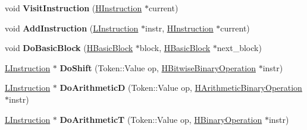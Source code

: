 \begin{DoxyCompactItemize}
\item 
void {\bfseries Visit\+Instruction} (\hyperlink{classv8_1_1internal_1_1_h_instruction}{H\+Instruction} $\ast$current)\hypertarget{classv8_1_1internal_1_1_l_chunk_builder_a4da411e2e5777292cd23626bb87e5dc4}{}\label{classv8_1_1internal_1_1_l_chunk_builder_a4da411e2e5777292cd23626bb87e5dc4}

\item 
void {\bfseries Add\+Instruction} (\hyperlink{classv8_1_1internal_1_1_l_instruction}{L\+Instruction} $\ast$instr, \hyperlink{classv8_1_1internal_1_1_h_instruction}{H\+Instruction} $\ast$current)\hypertarget{classv8_1_1internal_1_1_l_chunk_builder_a834f4cd3c745234bc4ee8470490cfc89}{}\label{classv8_1_1internal_1_1_l_chunk_builder_a834f4cd3c745234bc4ee8470490cfc89}

\item 
void {\bfseries Do\+Basic\+Block} (\hyperlink{classv8_1_1internal_1_1_h_basic_block}{H\+Basic\+Block} $\ast$block, \hyperlink{classv8_1_1internal_1_1_h_basic_block}{H\+Basic\+Block} $\ast$next\+\_\+block)\hypertarget{classv8_1_1internal_1_1_l_chunk_builder_a0ba0ae4aeac5d0656366705f205680ed}{}\label{classv8_1_1internal_1_1_l_chunk_builder_a0ba0ae4aeac5d0656366705f205680ed}

\item 
\hyperlink{classv8_1_1internal_1_1_l_instruction}{L\+Instruction} $\ast$ {\bfseries Do\+Shift} (Token\+::\+Value op, \hyperlink{classv8_1_1internal_1_1_h_bitwise_binary_operation}{H\+Bitwise\+Binary\+Operation} $\ast$instr)\hypertarget{classv8_1_1internal_1_1_l_chunk_builder_af88fe45d4b90aee8f64ed924012a0ecc}{}\label{classv8_1_1internal_1_1_l_chunk_builder_af88fe45d4b90aee8f64ed924012a0ecc}

\item 
\hyperlink{classv8_1_1internal_1_1_l_instruction}{L\+Instruction} $\ast$ {\bfseries Do\+ArithmeticD} (Token\+::\+Value op, \hyperlink{classv8_1_1internal_1_1_h_arithmetic_binary_operation}{H\+Arithmetic\+Binary\+Operation} $\ast$instr)\hypertarget{classv8_1_1internal_1_1_l_chunk_builder_a8958b7752c6cf0428c56f1620d292a14}{}\label{classv8_1_1internal_1_1_l_chunk_builder_a8958b7752c6cf0428c56f1620d292a14}

\item 
\hyperlink{classv8_1_1internal_1_1_l_instruction}{L\+Instruction} $\ast$ {\bfseries Do\+ArithmeticT} (Token\+::\+Value op, \hyperlink{classv8_1_1internal_1_1_h_binary_operation}{H\+Binary\+Operation} $\ast$instr)\hypertarget{classv8_1_1internal_1_1_l_chunk_builder_a4cc9b50b724208821799d46ff99b66a9}{}\label{classv8_1_1internal_1_1_l_chunk_builder_a4cc9b50b724208821799d46ff99b66a9}


\end{DoxyCompactItemize}
